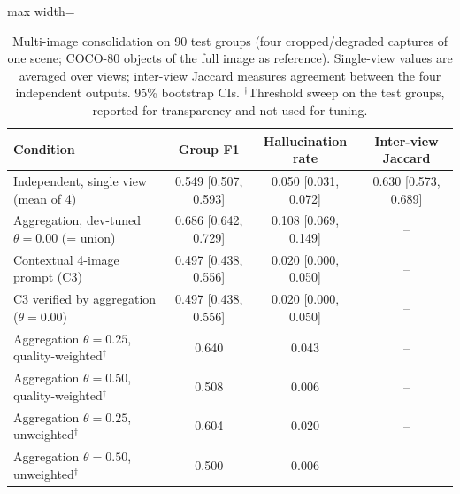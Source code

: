 \begin{table}[!t]
\centering
\footnotesize
\caption{Multi-image consolidation on 90 test groups (four cropped/degraded captures of one scene; COCO-80 objects of the full image as reference). Single-view values are averaged over views; inter-view Jaccard measures agreement between the four independent outputs. 95\% bootstrap CIs. $^\dagger$Threshold sweep on the test groups, reported for transparency and not used for tuning.}
\label{tab:exp3}
\begin{adjustbox}{max width=\columnwidth}
\begin{tabular}{lccc}
\toprule
Condition & Group F1 & Hallucination rate & Inter-view Jaccard \\
\midrule
Independent, single view (mean of 4) & 0.549 [0.507, 0.593] & 0.050 [0.031, 0.072] & 0.630 [0.573, 0.689] \\
Aggregation, dev-tuned $\theta=0.00$ (= union) & 0.686 [0.642, 0.729] & 0.108 [0.069, 0.149] & -- \\
Contextual 4-image prompt (C3) & 0.497 [0.438, 0.556] & 0.020 [0.000, 0.050] & -- \\
C3 verified by aggregation ($\theta=0.00$) & 0.497 [0.438, 0.556] & 0.020 [0.000, 0.050] & -- \\
\midrule
Aggregation $\theta=0.25$, quality-weighted$^\dagger$ & 0.640 & 0.043 & -- \\
Aggregation $\theta=0.50$, quality-weighted$^\dagger$ & 0.508 & 0.006 & -- \\
Aggregation $\theta=0.25$, unweighted$^\dagger$ & 0.604 & 0.020 & -- \\
Aggregation $\theta=0.50$, unweighted$^\dagger$ & 0.500 & 0.006 & -- \\
\bottomrule
\end{tabular}
\end{adjustbox}
\end{table}

